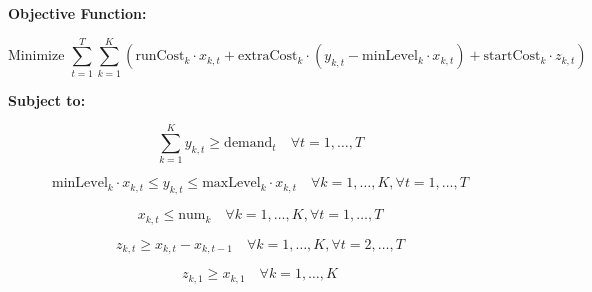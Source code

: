 \documentclass{article}
\begin{document}
\textbf{Objective Function:}

\[
\text{Minimize } \sum_{t=1}^{T} \sum_{k=1}^{K} \left( \text{runCost}_k \cdot x_{k,t} + \text{extraCost}_k \cdot (y_{k,t} - \text{minLevel}_k \cdot x_{k,t}) + \text{startCost}_k \cdot z_{k,t} \right)
\]

\textbf{Subject to:}

\[
\sum_{k=1}^{K} y_{k,t} \geq \text{demand}_t \quad \forall t = 1, \ldots, T
\]

\[
\text{minLevel}_k \cdot x_{k,t} \leq y_{k,t} \leq \text{maxLevel}_k \cdot x_{k,t} \quad \forall k = 1, \ldots, K, \forall t = 1, \ldots, T
\]

\[
x_{k,t} \leq \text{num}_k \quad \forall k = 1, \ldots, K, \forall t = 1, \ldots, T
\]

\[
z_{k,t} \geq x_{k,t} - x_{k,t-1} \quad \forall k = 1, \ldots, K, \forall t = 2, \ldots, T
\]

\[
z_{k,1} \geq x_{k,1} \quad \forall k = 1, \ldots, K
\]
\end{document}
